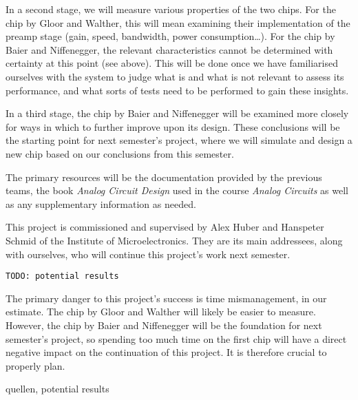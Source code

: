 \documentclass[a4paper,10pt]{article}
\begin{document}
In a  second stage, we will  measure various properties of  the two chips. For
the chip by  Gloor and Walther, this will mean  examining their implementation
of the preamp stage (gain, speed, bandwidth, power consumption\ldots). For the
chip  by  Baier  and  Niffenegger,  the  relevant  characteristics  cannot  be
determined with certainty at this point (see above). This will be done once we
have familiarised ourselves with  the system to judge what is  and what is not
relevant  to assess  its  performance, and  what  sorts of  tests  need to  be
performed to gain these insights.

In  a  third  stage, the  chip  by  Baier  and  Niffenegger will  be  examined
more  closely for  ways in  which to  further improve  upon its  design. These
conclusions will be  the starting point for next semester's  project, where we
will  simulate and  design  a new  chip  based on  our  conclusions from  this
semester.

The  primary resources  will be  the  documentation provided  by the  previous
teams, the book  \emph{Analog Circuit Design} used in  the course \emph{Analog
Circuits} as well as any supplementary information as needed.

This project is commissioned and supervised by Alex Huber and Hanspeter Schmid
of the Institute of Microelectronics. They are its main addressees, along with
ourselves, who will continue this project's work next semester.

\texttt{TODO: potential results}

The primary  danger to this  project's success  is time mismanagement,  in our
estimate. The chip  by Gloor  and Walther  will likely  be easier  to measure.
However, the  chip by Baier  and Niffenegger will  be the foundation  for next
semester's project, so  spending too much time  on the first chip  will have a
direct negative  impact on the  continuation of this project. It  is therefore
crucial to properly plan.


quellen, potential results
\end{document}
